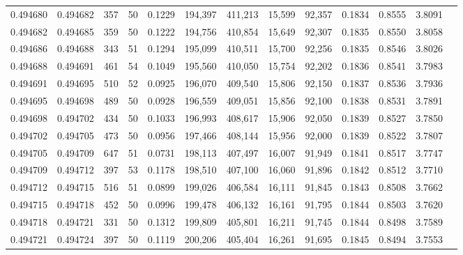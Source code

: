 \begin{tabular}{rrrrrrrrrrrrr}
0.494680 & 0.494682 &   357 &  50 &                                     0.1229 & 194,397 & 411,213 &  15,599 &  92,357 & 0.1834 & 0.8555 & 3.8091 \\
0.494682 & 0.494685 &   359 &  50 &                                     0.1222 & 194,756 & 410,854 &  15,649 &  92,307 & 0.1835 & 0.8550 & 3.8058 \\
0.494686 & 0.494688 &   343 &  51 &                                     0.1294 & 195,099 & 410,511 &  15,700 &  92,256 & 0.1835 & 0.8546 & 3.8026 \\
0.494688 & 0.494691 &   461 &  54 &                                     0.1049 & 195,560 & 410,050 &  15,754 &  92,202 & 0.1836 & 0.8541 & 3.7983 \\
0.494691 & 0.494695 &   510 &  52 &                                     0.0925 & 196,070 & 409,540 &  15,806 &  92,150 & 0.1837 & 0.8536 & 3.7936 \\
0.494695 & 0.494698 &   489 &  50 &                                     0.0928 & 196,559 & 409,051 &  15,856 &  92,100 & 0.1838 & 0.8531 & 3.7891 \\
0.494698 & 0.494702 &   434 &  50 &                                     0.1033 & 196,993 & 408,617 &  15,906 &  92,050 & 0.1839 & 0.8527 & 3.7850 \\
0.494702 & 0.494705 &   473 &  50 &                                     0.0956 & 197,466 & 408,144 &  15,956 &  92,000 & 0.1839 & 0.8522 & 3.7807 \\
0.494705 & 0.494709 &   647 &  51 &                                     0.0731 & 198,113 & 407,497 &  16,007 &  91,949 & 0.1841 & 0.8517 & 3.7747 \\
0.494709 & 0.494712 &   397 &  53 &                                     0.1178 & 198,510 & 407,100 &  16,060 &  91,896 & 0.1842 & 0.8512 & 3.7710 \\
0.494712 & 0.494715 &   516 &  51 &                                     0.0899 & 199,026 & 406,584 &  16,111 &  91,845 & 0.1843 & 0.8508 & 3.7662 \\
0.494715 & 0.494718 &   452 &  50 &                                     0.0996 & 199,478 & 406,132 &  16,161 &  91,795 & 0.1844 & 0.8503 & 3.7620 \\
0.494718 & 0.494721 &   331 &  50 &                                     0.1312 & 199,809 & 405,801 &  16,211 &  91,745 & 0.1844 & 0.8498 & 3.7589 \\
0.494721 & 0.494724 &   397 &  50 &                                     0.1119 & 200,206 & 405,404 &  16,261 &  91,695 & 0.1845 & 0.8494 & 3.7553 \\

\end{tabular}
